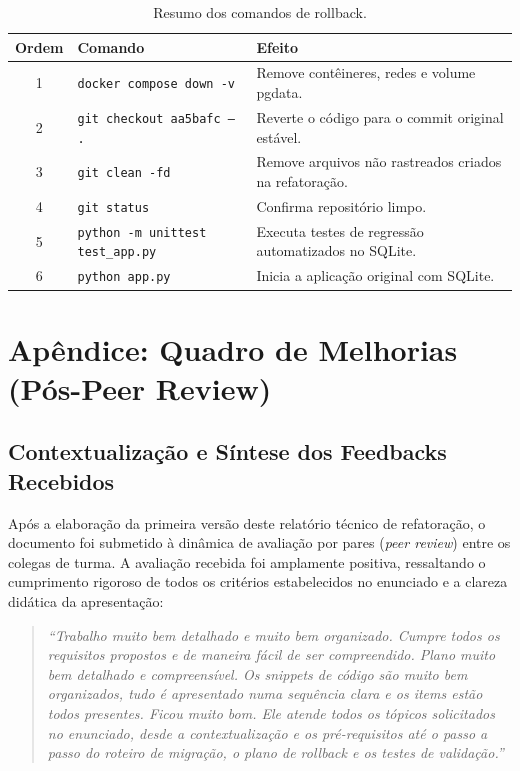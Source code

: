 \documentclass[12pt,a4paper]{article}
\begin{document}
\begin{table}[h]
  \centering
  \caption{Resumo dos comandos de rollback.}
  \vspace{0.4em}
  \label{tab:rollback}
  \begin{tabular}{clp{7.5cm}}
    \toprule
    \textbf{Ordem} & \textbf{Comando} & \textbf{Efeito} \\
    \midrule
    1 & \texttt{docker compose down -v} & Remove contêineres, redes e volume pgdata. \\
    2 & \texttt{git checkout aa5bafc -- .} & Reverte o código para o commit original estável. \\
    3 & \texttt{git clean -fd}          & Remove arquivos não rastreados criados na refatoração. \\
    4 & \texttt{git status}             & Confirma repositório limpo. \\
    5 & \texttt{python -m unittest test\_app.py} & Executa testes de regressão automatizados no SQLite. \\
    6 & \texttt{python app.py}          & Inicia a aplicação original com SQLite. \\
    \bottomrule
  \end{tabular}
\end{table}

\newpage
\section{Apêndice: Quadro de Melhorias (Pós-Peer Review)}
\label{sec:melhorias-peer-review}

\subsection{Contextualização e Síntese dos Feedbacks Recebidos}

Após a elaboração da primeira versão deste relatório técnico de refatoração, o documento
foi submetido à dinâmica de avaliação por pares (\textit{peer review}) entre os colegas
de turma. A avaliação recebida foi amplamente positiva, ressaltando o cumprimento rigoroso
de todos os critérios estabelecidos no enunciado e a clareza didática da apresentação:

\begin{quote}
\textit{``Trabalho muito bem detalhado e muito bem organizado. Cumpre todos os
requisitos propostos e de maneira fácil de ser compreendido. Plano muito bem
detalhado e compreensível. Os snippets de código são muito bem organizados, tudo é
apresentado numa sequência clara e os items estão todos presentes. Ficou muito bom.
Ele atende todos os tópicos solicitados no enunciado, desde a contextualização e os
pré-requisitos até o passo a passo do roteiro de migração, o plano de rollback e os
testes de validação.''}
\end{quote}
\end{document}
